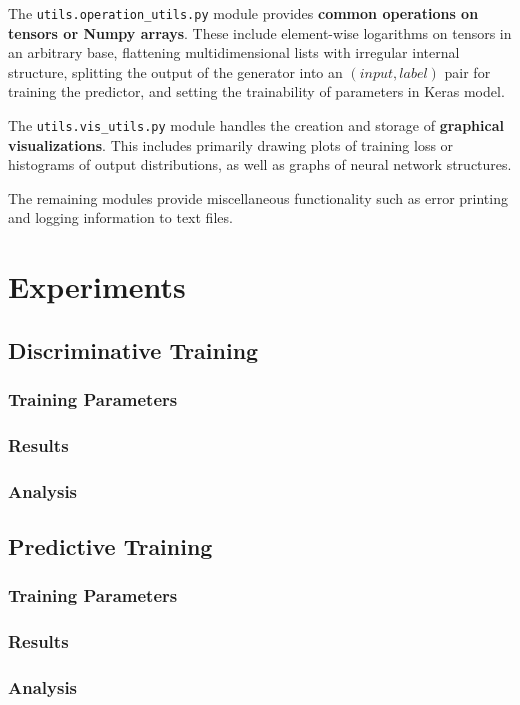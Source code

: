\documentclass[12pt, titlepage]{report}
\theoremstyle{definition}
\begin{document}
The \texttt{utils.operation_utils.py} module provides \textbf{common operations on tensors or Numpy arrays}. These include element-wise logarithms on tensors in an arbitrary base, flattening multidimensional lists with irregular internal structure, splitting the output of the generator into an $(input, label)$ pair for training the predictor, and setting the trainability of parameters in Keras model.

The \texttt{utils.vis_utils.py} module handles the creation and storage of \textbf{graphical visualizations}. This includes primarily drawing plots of training loss or histograms of output distributions, as well as graphs of neural network structures.

The remaining modules provide miscellaneous functionality such as error printing and logging information to text files.


\chapter{Experiments}\label{chapter:experiments}
\section{Discriminative Training}
\subsection{Training Parameters}
\subsection{Results}
\subsection{Analysis}
\section{Predictive Training}
\subsection{Training Parameters}
\subsection{Results}
\subsection{Analysis}
\end{document}
